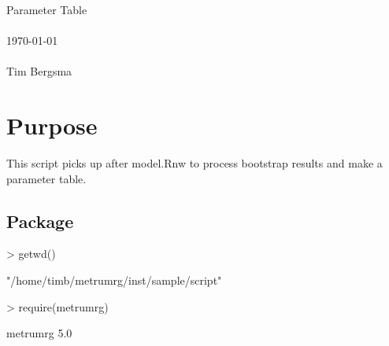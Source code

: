 
\usepackage{Sweave}

 

\vspace*{2cm}
\begin{center}
{\Large Parameter Table}\\
~\\
\today\\
~\\
Tim Bergsma\\
\end{center}
\newpage

\section{Purpose}
This script picks up after model.Rnw to process bootstrap results and make a parameter table.
\subsection{Package}
\begin{Schunk}
\begin{Sinput}
> getwd()
\end{Sinput}
\begin{Soutput}
[1] "/home/timb/metrumrg/inst/sample/script"
\end{Soutput}
\begin{Sinput}
> require(metrumrg)
\end{Sinput}
\begin{Soutput}
metrumrg 5.0 
\end{Soutput}
\end{Schunk}
